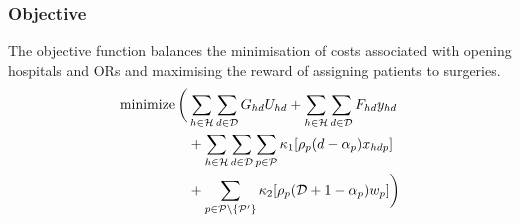 \subsubsection*{Objective}

The objective function balances the minimisation of costs associated with opening hospitals
 and ORs and maximising the reward of assigning patients to surgeries. 
\begin{align}
\operatorname{minimize} \bigg( &\sum\limits_{h \in \mathcal{H}} \sum\limits_{d \in \mathcal{D}} G_{hd} U_{hd} 
 + \sum\limits_{h \in \mathcal{H}}\sum\limits_{d \in \mathcal{D}} F_{hd} y_{hd} \label{eq:MPobjective}
\\ &+ \sum\limits_{h \in \mathcal{H}} \sum\limits_{d \in \mathcal{D}} \sum\limits_{p \in \mathcal{P}}  
\kappa_{1} [\rho_{p} (d - \alpha_{p}) x_{hdp}]\notag
\\ &+ \sum\limits_{p \in \mathcal{P} \setminus \lbrace \mathcal{P}{'} \rbrace } \kappa_{2} [\rho_{p}( \mathcal{D} + 1 -\alpha_{p} ) w_{p}]
\bigg) \notag
\end{align}

